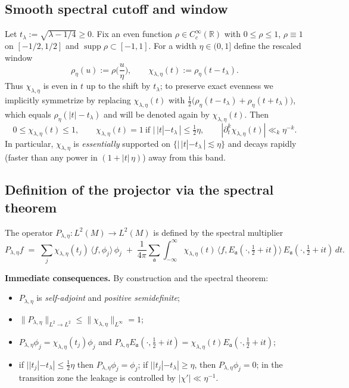 \subsection*{Smooth spectral cutoff and window}

Let $t_\lambda:=\sqrt{\lambda-1/4}\ge 0$. Fix an even function
$\rho\in C_c^\infty(\mathbb{R})$ with $0\le \rho\le 1$, $\rho\equiv 1$ on $[-1/2,1/2]$ and
$\operatorname{supp}\rho\subset[-1,1]$. For a width $\eta\in(0,1]$ define the rescaled window
\[
  \rho_\eta(u):=\rho\!\Big(\frac{u}{\eta}\Big),\qquad
  \chi_{\lambda,\eta}(t):=\rho_\eta(t-t_\lambda).
\]
Thus $\chi_{\lambda,\eta}$ is even in $t$ up to the shift by $t_\lambda$; to preserve exact evenness
we implicitly symmetrize by replacing $\chi_{\lambda,\eta}(t)$ with
$\tfrac12\big(\rho_\eta(t-t_\lambda)+\rho_\eta(t+t_\lambda)\big)$, which equals $\rho_\eta(|t|-t_\lambda)$
and will be denoted again by $\chi_{\lambda,\eta}(t)$.
Then
\[
  0\le \chi_{\lambda,\eta}(t)\le 1,\qquad
  \chi_{\lambda,\eta}(t)=1\ \text{if } |\,|t|-t_\lambda\,|\le \tfrac12\eta,\qquad
  |\partial_t^k\chi_{\lambda,\eta}(t)|\ll_k \eta^{-k}.
\]
In particular, $\chi_{\lambda,\eta}$ is \emph{essentially} supported on
$\{|\,|t|-t_\lambda\,|\lesssim \eta\}$ and decays rapidly (faster than any power in $(1+|t|\,\eta)$) away from this band.

\subsection*{Definition of the projector via the spectral theorem}

\begin{definition}\label{def:Plambdaeta}
The operator $P_{\lambda,\eta}:L^2(M)\to L^2(M)$ is defined by the spectral multiplier
\[
  P_{\lambda,\eta}f
  \;=\;
  \sum_{j}\chi_{\lambda,\eta}(t_j)\,\langle f,\phi_j\rangle\,\phi_j
  \;+\;
  \frac{1}{4\pi}\sum_{\mathfrak a}\int_{-\infty}^{\infty}
  \chi_{\lambda,\eta}(t)\,\langle f,E_{\mathfrak a}(\cdot,\tfrac12+it)\rangle\,
  E_{\mathfrak a}(\cdot,\tfrac12+it)\,dt.
\]
\end{definition}

\noindent\textbf{Immediate consequences.}
By construction and the spectral theorem:
\begin{itemize}
  \item $P_{\lambda,\eta}$ is \emph{self-adjoint} and \emph{positive semidefinite};
  \item $\|P_{\lambda,\eta}\|_{L^2\to L^2}\le \|\chi_{\lambda,\eta}\|_{L^\infty}=1$;
  \item $P_{\lambda,\eta}\phi_j=\chi_{\lambda,\eta}(t_j)\phi_j$ and
        $P_{\lambda,\eta}E_{\mathfrak a}(\cdot,\tfrac12+it)=\chi_{\lambda,\eta}(t)E_{\mathfrak a}(\cdot,\tfrac12+it)$;
  \item if $||t_j|-t_\lambda|\le \tfrac12\eta$ then $P_{\lambda,\eta}\phi_j=\phi_j$; if $||t_j|-t_\lambda|\ge \eta$,
        then $P_{\lambda,\eta}\phi_j=0$; in the transition zone the leakage is controlled by
        $|\chi'|\ll \eta^{-1}$.
\end{itemize}

